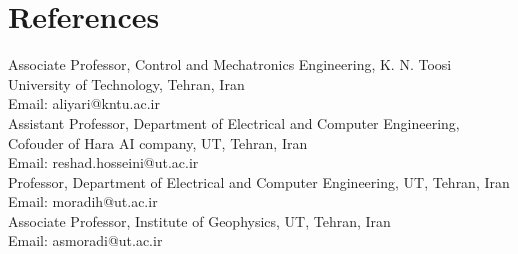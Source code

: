 \section{References}
  \vspace{2pt}
  \resumeSubHeadingListStart
    \small{\item{

        \textbf{}{ Associate Professor, Control and Mechatronics Engineering, K. N. Toosi University of Technology, Tehran, Iran\\Email: aliyari@kntu.ac.ir}\\ \vspace{3pt}
        \textbf{}{ Assistant Professor, Department of Electrical and Computer Engineering, Cofouder of Hara AI company, UT, Tehran, Iran\\Email: reshad.hosseini@ut.ac.ir}\\ \vspace{3pt}
        \textbf{}{ Professor, Department of Electrical and Computer Engineering, UT, Tehran, Iran\\Email: moradih@ut.ac.ir}\\ \vspace{3pt}
        \textbf{}{ Associate Professor, Institute of Geophysics, UT, Tehran, Iran\\Email: asmoradi@ut.ac.ir}\\ \vspace{3pt}

}}
\resumeSubHeadingListEnd
